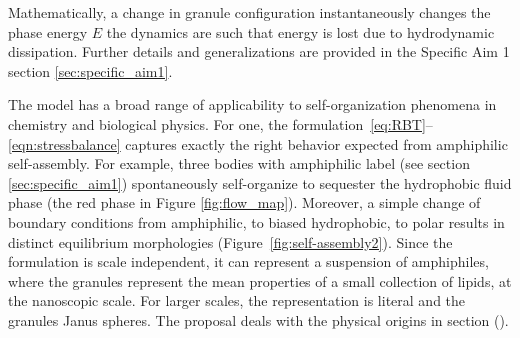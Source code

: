 Mathematically, a change in granule configuration
instantaneously changes the phase energy $E$
the dynamics are such that energy is lost due to hydrodynamic dissipation.
Further details and generalizations are provided in
the Specific Aim 1 section \ref{sec:specific_aim1}.


The model has a broad range of applicability to self-organization
phenomena in chemistry and biological physics. For one,
the formulation~\eqref{eq:RBT}--\eqref{eqn:stressbalance} captures
exactly the right behavior expected from amphiphilic self-assembly.
For example, three bodies with amphiphilic label
(see section \ref{sec:specific_aim1}) spontaneously
self-organize to sequester the hydrophobic fluid phase
(the red phase in Figure \ref{fig:flow_map}).
Moreover, a simple change of boundary conditions from
amphiphilic, to biased hydrophobic, to polar results in distinct
equilibrium morphologies (Figure~\ref{fig:self-assembly2}).
Since the formulation is
scale independent, it can represent a suspension of amphiphiles, where
the granules represent the mean properties of a small collection of
lipids, at the nanoscopic scale. For larger scales, the representation
is literal and the granules Janus spheres. The proposal deals with the
physical origins in section ().

